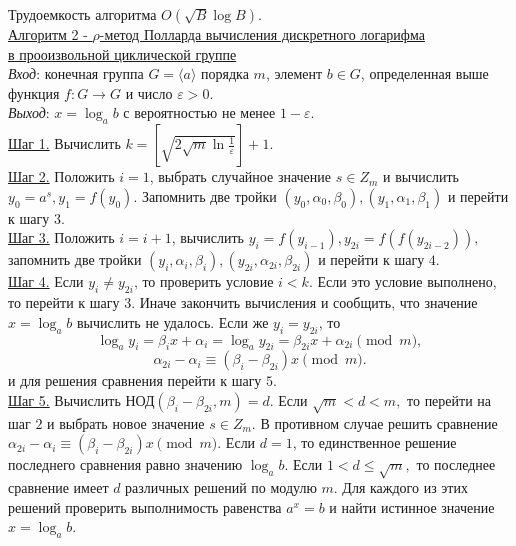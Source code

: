 \documentclass[bachelor, och, labwork]{shiza}
\begin{document}
            Трудоемкость алгоритма $O(\sqrt{B} \log B)$.\\

        \underline{Алгоритм 2 - $\rho$-метод Полларда вычисления дискретного
        логарифма}\\
        \underline{в прооизвольной циклической группе}\\
            \textit{Вход}: конечная группа $G = \langle a \rangle$ порядка $m$,
            элемент $b \in G$, определенная выше функция $f: G \to G$ и число
            $\varepsilon > 0$.\\
            \textit{Выход}: $x = \log_a b$ с вероятностью не менее $1 -
            \varepsilon$.\\
            \underline{Шаг 1.} Вычислить $k = [\sqrt{2\sqrt{m}\ln
            \frac{1}{\varepsilon}}] + 1$.\\
            \underline{Шаг 2.} Положить $i = 1$, выбрать случайное значение $s
            \in Z_m$ и вычислить $y_0 = a^s, y_1 = f(y_0)$. Запомнить две тройки
            $(y_0, \alpha_0, \beta_0), (y_1, \alpha_1, \beta_1)$ и перейти к
            шагу $3$.\\
            \underline{Шаг 3.} Положить $i = i + 1$, вычислить $y_i =
            f(y_{i-1}), y_{2i} = f(f(y_{2i - 2})),$ запомнить две тройки $(y_i,
            \alpha_i, \beta_i), (y_{2i}, \alpha_{2i}, \beta_{2i})$ и перейти к
            шагу $4$.\\
            \underline{Шаг 4.} Если $y_i \neq y_{2i}$, то проверить условие $i <
            k$. Если это условие выполнено, то перейти к шагу $3$. Иначе
            закончить вычисления и сообщить, что значение $x = \log_a b$
            вычислить не удалось. Если же $y_i = y_{2i}$, то $$\log_a y_i =
            \beta_i x + \alpha_i = \log_a y_{2i} = \beta_{2i} x + \alpha_{2i}
            \pmod m,$$ $$\alpha_{2i} - \alpha_i \equiv (\beta_i - \beta_{2i})x
            \pmod m.$$ и для решения сравнения перейти к шагу $5$.\\
            \underline{Шаг 5.} Вычислить НОД$(\beta_i - \beta_{2i}, m) = d$.
            Если $\sqrt{m} < d < m,$ то перейти на шаг $2$ и выбрать новое
            значение $s \in Z_m.$ В противном случае решить сравнение
            $\alpha_{2i} - \alpha_i \equiv (\beta_i - \beta_{2i})x \pmod m.$
            Если $d = 1$, то единственное решение последнего сравнения равно
            значению $\log_a b$. Если  $1 < d \leq \sqrt{m},$ то последнее
            сравнение имеет $d$ различных решений по модулю $m$. Для каждого из
            этих решений проверить выполнимость равенства $a^x = b$ и найти
            истинное значение $x = \log_a b$.\\
            
\end{document}
